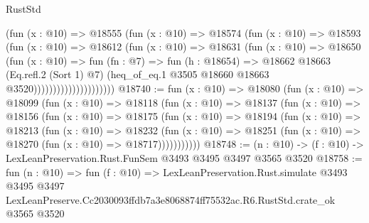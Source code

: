 \begin{lexlean}{RustStd}
\begin{coremodule}
                              (fun (x : @10) =>
                              @18555
                                (fun (x : @10) =>
                                @18574
                                  (fun (x : @10) =>
                                  @18593
                                    (fun (x : @10) =>
                                    @18612
                                      (fun (x : @10) =>
                                      @18631
                                        (fun (x : @10) =>
                                        @18650
                                          (fun (x : @10) =>
                                          fun (fn : @7) =>
                                          fun (h : @18654) =>
                                          @18662
                                            @18663
                                            (Eq.refl.{2} (Sort 1) @7)
                                            (heq_of_eq.{1}
                                              @3505
                                              @18660
                                              @18663
                                              @3520)))))))))))))))))))))
@18740 := fun (x : @10) =>
  @18080
    (fun (x : @10) =>
    @18099
      (fun (x : @10) =>
      @18118
        (fun (x : @10) =>
        @18137
          (fun (x : @10) =>
          @18156
            (fun (x : @10) =>
            @18175
              (fun (x : @10) =>
              @18194
                (fun (x : @10) =>
                @18213
                  (fun (x : @10) =>
                  @18232
                    (fun (x : @10) =>
                    @18251 (fun (x : @10) => @18270 (fun (x : @10) => @18717)))))))))))
@18748 := (n : @10) -> (f : @10) -> LexLeanPreservation.Rust.FunSem @3493 @3495 @3497 @3565 @3520
@18758 := fun (n : @10) =>
  fun (f : @10) =>
  LexLeanPreservation.Rust.simulate
    @3493
    @3495
    @3497
    LexLeanPreserve.Cc2030093ffdb7a3e8068874ff75532ac.R6.RustStd.crate_ok
    @3565
    @3520
\end{coremodule}
\end{lexlean}
